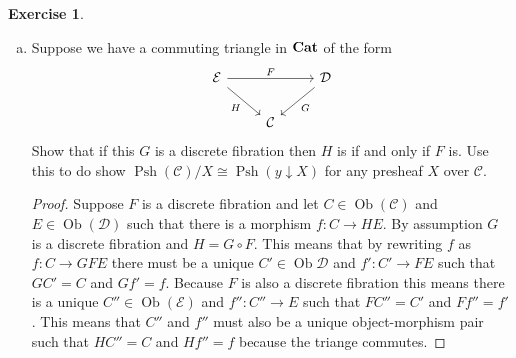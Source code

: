 \documentclass{article}
\newcommand{\catcat}{{\bf Cat}}
\newcommand{\cat}{\mathcal{C}}
\newcommand{\catt}{\mathcal{D}}
\newcommand{\cattt}{\mathcal{E}}
\DeclareMathOperator{\objects}{Ob}
\DeclareMathOperator{\psh}{Psh}
\DeclareMathOperator{\dfib}{DFib}
\theoremstyle{definition}
\newtheorem{question}{Exercise}
\begin{document}
\begin{question}
\begin{enumerate}[(a)]
\begin{proof}
                  Similarly for any function \(f,f':E\to E'\) we must have that
                  if \(yFf=Gf=Gf'=yFf'\) then \(f=f'\) because \(F\) is a
                  discrete fibration and therefore faithful and \(y\) is
                  faithful by the Yoneda lemma.

                  Now take any morphism \(f:(yFE,\nu^{E})\to (yFE',\nu^{E'})\)
                  in the comma category. By the Yoneda lemma there is some
                  \(f':FE\to FE'\) such that \(yf'=f\). Because \(F\) is a
                  discrete fibration this gives a \(g:E\to E'\) with \(Fg=f'\)
                  so \(Gg=yFg=yf'=f\).

                  This shows that \(G\) is a bijective functor and therefore an
                  isomorphism.

                  This shows that \(F:\catt\to \dfib(\cat)\) is a fully faithful
                  and essentially surjective functor and therefore an
                  equivalence.
              \end{proof}

        \item Suppose we have a commuting triangle in \(\catcat\) of the form
              \[
                  \begin{tikzcd}[ampersand replacement=\&]
                      \cattt \&\& \catt \\
                      \& \cat
                      \arrow["F", from=1-1, to=1-3]
                      \arrow["H"', from=1-1, to=2-2]
                      \arrow["G", from=1-3, to=2-2]
                  \end{tikzcd}
              \]
              Show that if this \(G\) is a discrete fibration then \(H\) is if
              and only if \(F\) is. Use this to do show \(\psh(\cat)/X\cong
              \psh(y\downarrow X)\) for any presheaf \(X\) over \(\cat\).

              \begin{proof}
                  Suppose \(F\) is a discrete fibration and let
                  \(C\in\objects(\cat)\) and \(E\in\objects(\catt)\) such that
                  there is a morphism \(f:C\to HE\). By assumption \(G\) is a
                  discrete fibration and \(H=G\circ F\). This means that by
                  rewriting \(f\) as \(f:C\to GFE\) there must be a unique
                  \(C'\in\objects\catt\) and \(f':C'\to FE\) such that \(GC'=C\)
                  and \(Gf'=f\). Because \(F\) is also a discrete fibration this
                  means there is a unique \(C''\in\objects(\cattt)\) and
                  \(f'':C''\to E\) such that \(FC''=C'\) and \(Ff''=f'\). This
                  means that \(C''\) and \(f''\) must also be a unique
                  object-morphism pair such that \(HC''=C\) and \(Hf''=f\)
                  because the triange commutes.


\end{proof}
\end{enumerate}
\end{question}
\end{document}

